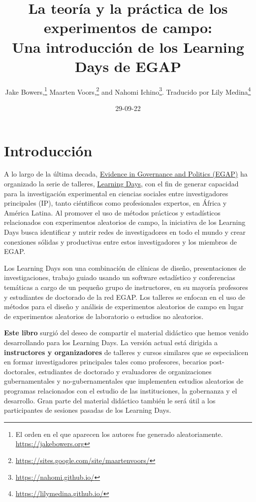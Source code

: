 \documentclass[12pt,spanish,]{book}
\title{La teoría y la práctica de los experimentos de campo:\\
Una introducción de los Learning Days de EGAP}
\author{Jake Bowers,\footnote{El orden en el que aparecen los autores fue generado aleatoriamente. \url{https://jakebowers.org}} Maarten Voors,\footnote{\url{https://sites.google.com/site/maartenvoors/}} and Nahomi Ichino\footnote{\url{https://nahomi.github.io/}}. Traducido por Lily Medina\footnote{\url{https://lilymedina.github.io/}}}
\date{29-09-22}
\begin{document}
\maketitle

\captionsetup[table]{list=no}
\captionsetup[figure]{list=no}

{
\hypersetup{linkcolor=}
\setcounter{tocdepth}{1}
\tableofcontents
}
\hypertarget{introducciuxf3n}{%
\chapter{Introducción}\label{introducciuxf3n}}

A lo largo de la última decada, \href{http://egap.org/}{Evidence in Governance and Politics (EGAP)} ha organizado la serie de talleres, \href{https://egap.org/learning-days/}{Learning Days}, con el fin de generar capacidad para la investigación experimental en ciencias sociales entre investigadores principales (IP), tanto ciéntificos como profesionales expertos, en África y América Latina. Al promover el uso de métodos prácticos y estadísticos relacionados con experimentos aleatorios de campo, la iniciativa de los Learning Days busca identificar y nutrir redes de investigadores en todo el mundo y crear conexiones sólidas y productivas entre estos investigadores y los miembros de EGAP.

Los Learning Days son una combinación de clínicas de diseño, presentaciones de investigaciones, trabajo guiado usando un software estadístico y conferencias temáticas a cargo de un pequeño grupo de instructores, en su mayoría profesores y estudiantes de doctorado de la red EGAP. Los talleres se enfocan en el uso de métodos para el diseño y análisis de experimentos aleatorios de campo en lugar de experimentos aleatorios de laboratorio o estudios no aleatorios.

\textbf{Este libro} surgió del deseo de compartir el material didáctico que hemos venido desarrollando para los Learning Days. La versión actual está dirigida a \textbf{instructores y organizadores} de talleres y cursos similares que se especialicen en formar investigadores principales tales como profesores, becarios post-doctorales, estudiantes de doctorado y evaluadores de organizaciones gubernamentales y no-gubernamentales que implementen estudios aleatorios de programas relacionados con el estudio de las instituciones, la gobernanza y el desarrollo. Gran parte del material didáctico también le será útil a los participantes de sesiones pasadas de los Learning Days.
\end{document}
